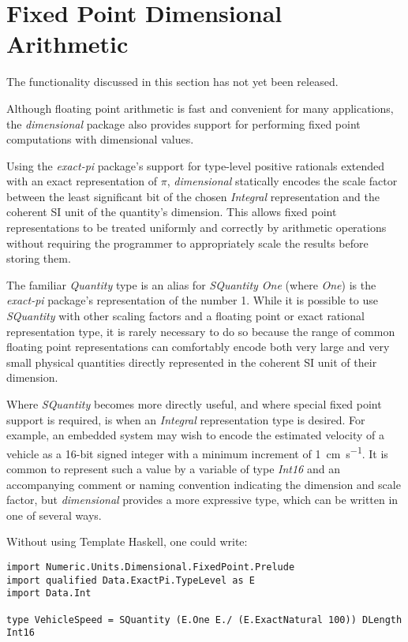 \documentclass[11pt]{report}
\newcommand{\packagename}[1]{\textit{#1}}
\newcommand{\thispackage}{\packagename{dimensional}}
\newcommand{\classname}[1]{\textit{#1}}
\newcommand{\typename}[1]{\textit{#1}}
\newcommand{\prerelease}{\begin{tcolorbox}
The functionality discussed in this section has not yet been released.
\end{tcolorbox}}
\begin{document}
\chapter{Fixed Point Dimensional Arithmetic}

\prerelease{}

Although floating point arithmetic is fast and convenient for many applications, the \thispackage{} package also provides
support for performing fixed point computations with dimensional values.

Using the \packagename{exact-pi} package's support for type-level positive rationals extended with an exact representation
of $ \pi $, \thispackage{} statically encodes the scale factor between the least significant bit of the chosen \classname{Integral}
representation and the coherent SI unit of the quantity's dimension. This allows fixed point representations to be
treated uniformly and correctly by arithmetic operations without requiring the programmer to appropriately scale the results
before storing them.

The familiar \typename{Quantity} type is an alias for \typename{SQuantity One} (where \typename{One}) is the \packagename{exact-pi}
package's representation of the number 1. While it is possible to use \typename{SQuantity} with other scaling factors and a
floating point or exact rational representation type, it is rarely necessary to do so because the range of common floating
point representations can comfortably encode both very large and very small physical quantities directly represented in the
coherent SI unit of their dimension.

Where \typename{SQuantity} becomes more directly useful, and where special fixed point support is required, is when an
\classname{Integral} representation type is desired. For example, an embedded system may wish to encode the estimated
velocity of a vehicle as a 16-bit signed integer with a minimum increment of \SI{1}{\centi\meter\per\second}. It is common
to represent such a value by a variable of type \typename{Int16} and an accompanying comment or naming convention indicating
the dimension and scale factor, but \thispackage{} provides a more expressive type, which can be written in one of several ways.

Without using Template Haskell, one could write:

\begin{lstlisting}
import Numeric.Units.Dimensional.FixedPoint.Prelude
import qualified Data.ExactPi.TypeLevel as E
import Data.Int

type VehicleSpeed = SQuantity (E.One E./ (E.ExactNatural 100)) DLength Int16
\end{lstlisting}
\end{document}

